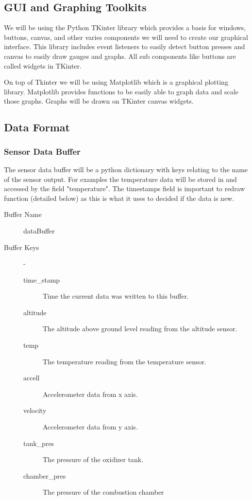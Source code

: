 \documentclass[10pt,draftclsnofoot,onecolumn,retainorgcmds]{IEEEtran}
\begin{document}
\subsection{GUI and Graphing Toolkits}
We will be using the Python TKinter library which provides a basis for windows, buttons, canvas, and other varies components we will need to create our graphical interface. This library includes event listeners to easily detect button presses and canvas to easily draw gauges and graphs. All sub components like buttons are called widgets in TKinter. \par
On top of Tkinter we will be using Matplotlib which is a graphical plotting library. Matplotlib provides functions to be easily able to graph data and scale those graphs. Graphs will be drawn on TKinter canvas widgets.\par

\subsection{Data Format}
\subsubsection{Sensor Data Buffer}
The sensor data buffer will be a python dictionary with keys relating to the name of the sensor output. For examples the temperature data will be stored in and accessed by the field "temperature".  The timestamps field is important to redraw function (detailed below) as this is what it uses to decided if the data is new.
\begin{description}
	\item[Buffer Name] dataBuffer
	\item[Buffer Keys]  -
	\begin{description}
		\item[time\_stamp] Time the current data was written to this buffer.
		\item[altitude] The altitude above ground level reading from the altitude sensor.
		\item[temp] The temperature reading from the temperature sensor.
		\item[accell] Accelerometer data from x axis.
		\item[velocity] Accelerometer data from y axis.
		\item[tank\_pres] The pressure of the oxidizer tank.
		\item[chamber\_pres] The pressure of the combustion chamber
	\end{description}
\end{description}
\end{document}
